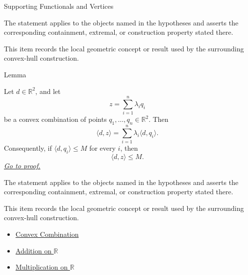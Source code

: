 \begin{topicbox}{Supporting Functionals and Vertices}
\begin{remark*}
The statement applies to the objects named in the hypotheses and asserts the
corresponding containment, extremal, or construction property stated there.
\end{remark*}

\begin{remark*}[Interpretation]
This item records the local geometric concept or result used by the surrounding
convex-hull construction.
\end{remark*}

\DefinitionalRoot

\begin{lemmabox}{Lemma}
\begin{lemma}
\label{lem:computational-geometry-linear-functionals-convex-combinations}
Let \(d\in\mathbb{R}^2\), and let
\[
  z=\sum_{i=1}^{n}\lambda_i q_i
\]
be a convex combination of points \(q_1,\dots,q_n\in\mathbb{R}^2\). Then
\[
  \langle d,z\rangle
  =
  \sum_{i=1}^{n}\lambda_i\langle d,q_i\rangle.
\]
Consequently, if \(\langle d,q_i\rangle\le M\) for every \(i\), then
\[
  \langle d,z\rangle\le M.
\]
\hyperref[prf:computational-geometry-linear-functionals-convex-combinations]{\textit{Go to proof.}}
\end{lemma}
\end{lemmabox}

\begin{remark*}
The statement applies to the objects named in the hypotheses and asserts the
corresponding containment, extremal, or construction property stated there.
\end{remark*}

\begin{remark*}[Interpretation]
This item records the local geometric concept or result used by the surrounding
convex-hull construction.
\end{remark*}

\begin{dependencies}
\begin{itemize}
  \item \hyperref[def:computational-geometry-convex-combination]{Convex Combination}
  \item \hyperref[def:addition-on-r]{Addition on $\mathbb{R}$}
  \item \hyperref[def:multiplication-on-r]{Multiplication on $\mathbb{R}$}
\end{itemize}
\end{dependencies}


\end{topicbox}
